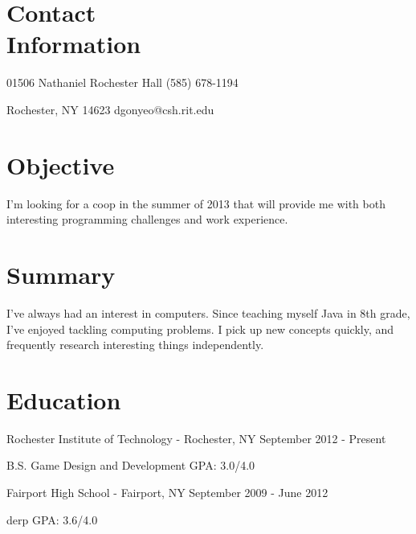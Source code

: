 \documentclass[letterpaper,margin,line,11pt]{resume}
\newcommand{\rdate}[1]{\hfill {\small #1}}
\begin{document}
\begin{resume}
\section{\mysidestyle Contact \\ Information} 
	\begin{asparablank}
		\item 01506 Nathaniel Rochester Hall \hfill (585) 678-1194
		\item Rochester, NY 14623 \hfill dgonyeo@csh.rit.edu
	\end{asparablank}

\section{\mysidestyle Objective}
	I'm looking for a coop in the summer of 2013 that will provide me with both interesting programming challenges and work experience.

\section{\mysidestyle Summary}
        I've always had an interest in computers. Since teaching myself Java in 8th grade, I've enjoyed tackling computing problems. I pick up new concepts quickly, and frequently research interesting things independently.

\section{\mysidestyle Education}
	\begin{compactdesc}
		\item[Rochester Institute of Technology] - Rochester, NY \rdate{September 2012 - Present}
		\begin{compactitem} { \small
			\item B.S. Game Design and Development \hfill GPA: 3.0/4.0
		} \end{compactitem}
                \item[Fairport High School] - Fairport, NY \rdate{September 2009 - June 2012}
                \begin{compactitem} {\small
                        \item derp \hfill GPA: 3.6/4.0
                } \end{compactitem}
	\end{compactdesc}


\end{resume}
\end{document}
